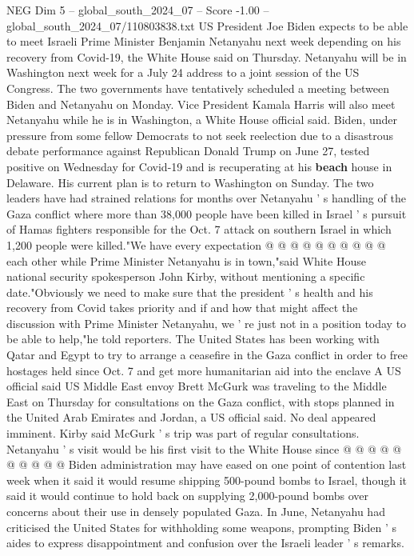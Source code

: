 \begin{textsample}{NEG Dim 5 – global\_south\_2024\_07 – Score -1.00 – global\_south\_2024\_07/110803838.txt}  \label{ex:f5_neg_295}
US President Joe Biden expects to be able to meet Israeli Prime Minister Benjamin Netanyahu next week depending on his recovery from Covid-19, the White House said on Thursday.
Netanyahu will be in Washington next week for a July 24 address to a joint session of the US Congress.
The two governments have tentatively scheduled a meeting between Biden and Netanyahu on Monday.
Vice President Kamala Harris will also meet Netanyahu while he is in Washington, a White House official said.
Biden, under pressure from some fellow Democrats to not seek reelection due to a disastrous debate performance against Republican Donald Trump on June 27, tested positive on Wednesday for Covid-19 and is recuperating at his \textbf{beach} house in Delaware.
His current plan is to return to Washington on Sunday.
The two leaders have had strained relations for months over Netanyahu ' s handling of the Gaza conflict where more than 38,000 people have been killed in Israel ' s pursuit of Hamas fighters responsible for the Oct. 7 attack on southern Israel in which 1,200 people were killed."We have every expectation @ @ @ @ @ @ @ @ @ @ each other while Prime Minister Netanyahu is in town,"said White House national security spokesperson John Kirby, without mentioning a specific date."Obviously we need to make sure that the president ' s health and his recovery from Covid takes priority and if and how that might affect the discussion with Prime Minister Netanyahu, we ' re just not in a position today to be able to help,"he told reporters.
The United States has been working with Qatar and Egypt to try to arrange a ceasefire in the Gaza conflict in order to free hostages held since Oct. 7 and get more humanitarian aid into the enclave A US official said US Middle East envoy Brett McGurk was traveling to the Middle East on Thursday for consultations on the Gaza conflict, with stops planned in the United Arab Emirates and Jordan, a US official said.
No deal appeared imminent.
Kirby said McGurk ' s trip was part of regular consultations.
Netanyahu ' s visit would be his first visit to the White House since @ @ @ @ @ @ @ @ @ @ Biden administration may have eased on one point of contention last week when it said it would resume shipping 500-pound bombs to Israel, though it said it would continue to hold back on supplying 2,000-pound bombs over concerns about their use in densely populated Gaza.
In June, Netanyahu had criticised the United States for withholding some weapons, prompting Biden ' s aides to express disappointment and confusion over the Israeli leader ' s remarks.

\end{textsample}
